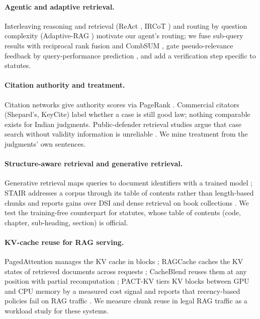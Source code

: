 \documentclass[sigconf,nonacm]{acmart}
\begin{document}
\paragraph{Agentic and adaptive retrieval.} Interleaving reasoning and retrieval (ReAct
\cite{react}, IRCoT \cite{ircot}) and routing by question complexity (Adaptive-RAG
\cite{adaptiverag}) motivate our agent's routing; we fuse sub-query results with reciprocal rank
fusion \cite{rrf} and CombSUM \cite{combsum}, gate pseudo-relevance feedback \cite{lavrenko2001} by
query-performance prediction \cite{cronentownsend2002}, and add a verification step specific to
statutes.

\paragraph{Citation authority and treatment.} Citation networks give authority scores via
PageRank \cite{pagerank}. Commercial citators (Shepard's, KeyCite) label whether a case is still
good law; nothing comparable exists for Indian judgments. Public-defender retrieval studies argue
that case search without validity information is unreliable \cite{publicdefenders}. We mine
treatment from the judgments' own sentences.

\paragraph{Structure-aware retrieval and generative retrieval.} Generative retrieval maps queries
to document identifiers with a trained model \cite{dsi}; STAIR addresses a corpus through its table
of contents rather than length-based chunks and reports gains over DSI and dense retrieval on book
collections \cite{stair}. We test the training-free counterpart for statutes, whose table of
contents (code, chapter, sub-heading, section) is official.

\paragraph{KV-cache reuse for RAG serving.} PagedAttention manages the KV cache in blocks
\cite{vllm}; RAGCache caches the KV states of retrieved documents across requests \cite{ragcache};
CacheBlend reuses them at any position with partial recomputation \cite{cacheblend}; PACT-KV tiers
KV blocks between GPU and CPU memory by a measured cost signal and reports that recency-based
policies fail on RAG traffic \cite{pactkv}. We measure chunk reuse in legal RAG traffic as a
workload study for these systems.
\end{document}
